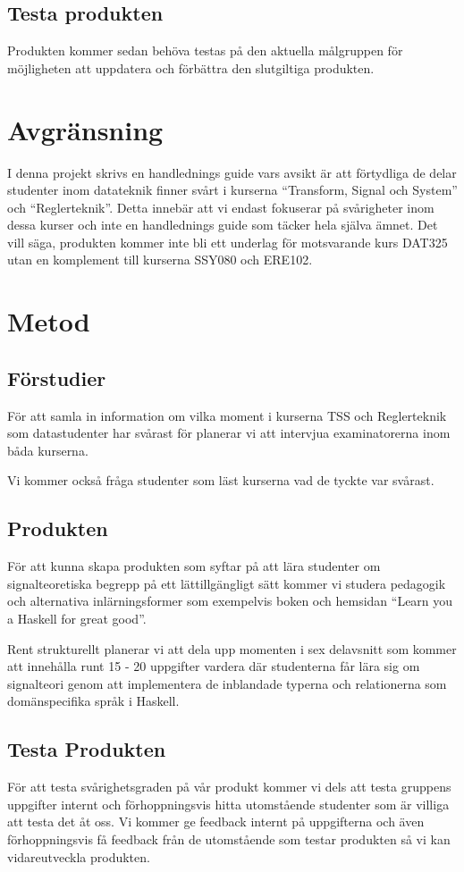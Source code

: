 \documentclass{article}
\begin{document}
\subsection{Testa produkten}
Produkten kommer sedan behöva testas på den aktuella målgruppen för möjligheten att uppdatera och förbättra den slutgiltiga produkten.
\section{Avgränsning}
I denna projekt skrivs en handlednings guide vars avsikt är att förtydliga de delar studenter inom datateknik finner svårt i kurserna “Transform, Signal och System” och “Reglerteknik”. Detta innebär att vi endast fokuserar på svårigheter inom dessa kurser och inte en handlednings guide som täcker hela själva ämnet.  Det vill säga, produkten kommer inte bli ett underlag för motsvarande kurs DAT325 utan en komplement till kurserna SSY080 och ERE102.
\section{Metod}
\subsection{Förstudier}
För att samla in information om vilka moment i kurserna TSS och Reglerteknik som datastudenter har svårast för planerar vi att intervjua examinatorerna inom båda kurserna.

Vi kommer också fråga studenter som läst kurserna vad de tyckte var svårast.
\subsection{Produkten}
För att kunna skapa produkten som syftar på att lära studenter om signalteoretiska begrepp på ett lättillgängligt sätt kommer vi studera pedagogik och alternativa inlärningsformer som exempelvis boken och hemsidan “Learn you a Haskell for great good”.

Rent strukturellt planerar vi att dela upp momenten i sex delavsnitt som kommer att innehålla runt 15 - 20 uppgifter vardera där studenterna får lära sig om signalteori genom att implementera de inblandade typerna och relationerna som domänspecifika språk i Haskell.
\subsection{Testa Produkten}
För att testa svårighetsgraden på vår produkt kommer vi dels att testa gruppens uppgifter internt och förhoppningsvis hitta utomstående studenter som är villiga att testa det åt oss. Vi kommer ge feedback internt på uppgifterna och även förhoppningsvis få feedback från de utomstående som testar produkten så vi kan vidareutveckla produkten.
\end{document}
